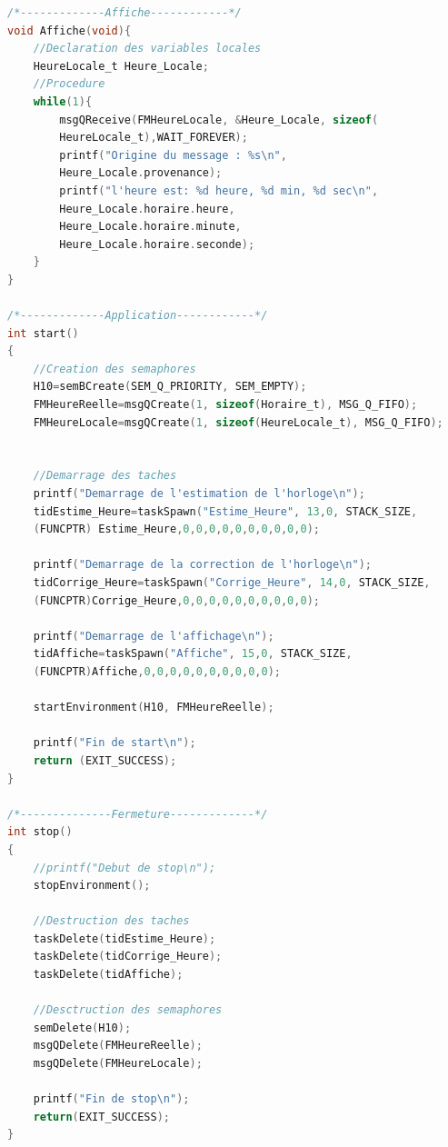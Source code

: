 \documentclass[french]{article}
\begin{document}
\begin{lstlisting}[language=C, frame=single]
/*-------------Affiche------------*/
void Affiche(void){
	//Declaration des variables locales
	HeureLocale_t Heure_Locale;
	//Procedure
	while(1){
		msgQReceive(FMHeureLocale, &Heure_Locale, sizeof(
		HeureLocale_t),WAIT_FOREVER);
		printf("Origine du message : %s\n", 
		Heure_Locale.provenance);
		printf("l'heure est: %d heure, %d min, %d sec\n", 
		Heure_Locale.horaire.heure, 
		Heure_Locale.horaire.minute, 
		Heure_Locale.horaire.seconde);
	}
}

/*-------------Application------------*/
int start()
{
	//Creation des semaphores
	H10=semBCreate(SEM_Q_PRIORITY, SEM_EMPTY);
	FMHeureReelle=msgQCreate(1, sizeof(Horaire_t), MSG_Q_FIFO); 
	FMHeureLocale=msgQCreate(1, sizeof(HeureLocale_t), MSG_Q_FIFO);
	
	
	//Demarrage des taches
	printf("Demarrage de l'estimation de l'horloge\n");
	tidEstime_Heure=taskSpawn("Estime_Heure", 13,0, STACK_SIZE, 
	(FUNCPTR) Estime_Heure,0,0,0,0,0,0,0,0,0,0);
	
	printf("Demarrage de la correction de l'horloge\n");
	tidCorrige_Heure=taskSpawn("Corrige_Heure", 14,0, STACK_SIZE, 
	(FUNCPTR)Corrige_Heure,0,0,0,0,0,0,0,0,0,0);
	
	printf("Demarrage de l'affichage\n");
	tidAffiche=taskSpawn("Affiche", 15,0, STACK_SIZE, 
	(FUNCPTR)Affiche,0,0,0,0,0,0,0,0,0,0);
	
	startEnvironment(H10, FMHeureReelle);
	
	printf("Fin de start\n");
	return (EXIT_SUCCESS);
}

/*--------------Fermeture-------------*/
int stop()
{
	//printf("Debut de stop\n");
	stopEnvironment();
	
	//Destruction des taches
	taskDelete(tidEstime_Heure);
	taskDelete(tidCorrige_Heure);
	taskDelete(tidAffiche);
	
	//Desctruction des semaphores
	semDelete(H10);
	msgQDelete(FMHeureReelle);
	msgQDelete(FMHeureLocale);
	
	printf("Fin de stop\n");
	return(EXIT_SUCCESS);
}

		
	\end{lstlisting}
	

	
\end{document}
